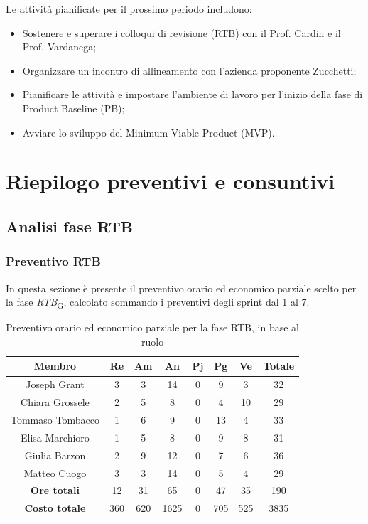 \documentclass[11pt,a4paper]{article}
\begin{document}
Le attività pianificate per il prossimo periodo includono:
\begin{itemize}
    \item Sostenere e superare i colloqui di revisione (RTB) con il Prof. Cardin e il Prof. Vardanega;
    \item Organizzare un incontro di allineamento con l'azienda proponente Zucchetti;
    \item Pianificare le attività e impostare l'ambiente di lavoro per l'inizio della fase di Product Baseline (PB);
    \item Avviare lo sviluppo del Minimum Viable Product (MVP).
\end{itemize}

\newpage
\section{Riepilogo preventivi e consuntivi}

\subsection{Analisi fase RTB}

\subsubsection{Preventivo RTB}
In questa sezione è presente il preventivo orario ed economico parziale scelto per la fase \textit{RTB}\textsubscript{G}, calcolato sommando i preventivi degli sprint dal 1 al 7.

\begin{table}[H]
    \centering
    \begin{tabular}{|c|c|c|c|c|c|c|c|}
        \hline
        \textbf{Membro} & \textbf{Re} & \textbf{Am} & \textbf{An} & \textbf{Pj} & \textbf{Pg} & \textbf{Ve} & \textbf{Totale} \\
        \hline
        Joseph Grant & 3 & 3 & 14 & 0 & 9 & 3 & 32 \\
        Chiara Grossele & 2 & 5 & 8 & 0 & 4 & 10 & 29 \\
        Tommaso Tombacco & 1 & 6 & 9 & 0 & 13 & 4 & 33 \\
        Elisa Marchioro & 1 & 5 & 8 & 0 & 9 & 8 & 31 \\
        Giulia Barzon & 2 & 9 & 12 & 0 & 7 & 6 & 36 \\
        Matteo Cuogo & 3 & 3 & 14 & 0 & 5 & 4 & 29 \\
        \hline
        \textbf{Ore totali} & 12 & 31 & 65 & 0 & 47 & 35 & 190 \\
        \hline
        \textbf{Costo totale} & 360 & 620 & 1625 & 0 & 705 & 525 & 3835 \\
        \hline
    \end{tabular}
    \caption{Preventivo orario ed economico parziale per la fase RTB, in base al ruolo}
\end{table}
\end{document}
